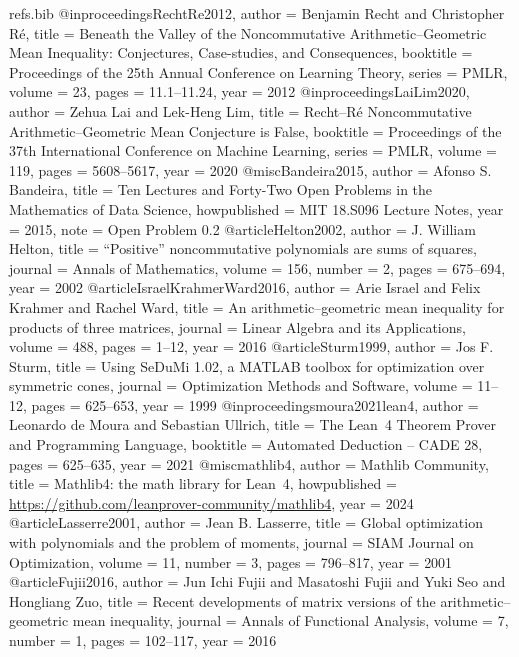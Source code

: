 %

\begin{filecontents*}{refs.bib}
@inproceedings{RechtRe2012,
  author    = {Benjamin Recht and Christopher R{\'e}},
  title     = {Beneath the Valley of the Noncommutative Arithmetic--Geometric Mean Inequality: Conjectures, Case-studies, and Consequences},
  booktitle = {Proceedings of the 25th Annual Conference on Learning Theory},
  series    = {PMLR},
  volume    = {23},
  pages     = {11.1--11.24},
  year      = {2012}
}
@inproceedings{LaiLim2020,
  author    = {Zehua Lai and Lek-Heng Lim},
  title     = {Recht--R{\'e} Noncommutative Arithmetic--Geometric Mean Conjecture is False},
  booktitle = {Proceedings of the 37th International Conference on Machine Learning},
  series    = {PMLR},
  volume    = {119},
  pages     = {5608--5617},
  year      = {2020}
}
@misc{Bandeira2015,
  author       = {Afonso S. Bandeira},
  title        = {Ten Lectures and Forty-Two Open Problems in the Mathematics of Data Science},
  howpublished = {MIT 18.S096 Lecture Notes},
  year         = {2015},
  note         = {Open Problem 0.2}
}
@article{Helton2002,
  author  = {J. William Helton},
  title   = {{``Positive''} noncommutative polynomials are sums of squares},
  journal = {Annals of Mathematics},
  volume  = {156},
  number  = {2},
  pages   = {675--694},
  year    = {2002}
}
@article{IsraelKrahmerWard2016,
  author  = {Arie Israel and Felix Krahmer and Rachel Ward},
  title   = {An arithmetic--geometric mean inequality for products of three matrices},
  journal = {Linear Algebra and its Applications},
  volume  = {488},
  pages   = {1--12},
  year    = {2016}
}
@article{Sturm1999,
  author  = {Jos F. Sturm},
  title   = {Using {SeDuMi} 1.02, a {MATLAB} toolbox for optimization over symmetric cones},
  journal = {Optimization Methods and Software},
  volume  = {11--12},
  pages   = {625--653},
  year    = {1999}
}
@inproceedings{moura2021lean4,
  author    = {Leonardo de Moura and Sebastian Ullrich},
  title     = {The {Lean}~4 Theorem Prover and Programming Language},
  booktitle = {Automated Deduction -- {CADE} 28},
  pages     = {625--635},
  year      = {2021}
}
@misc{mathlib4,
  author       = {{Mathlib Community}},
  title        = {Mathlib4: the math library for {Lean}~4},
  howpublished = {\url{https://github.com/leanprover-community/mathlib4}},
  year         = {2024}
}
@article{Lasserre2001,
  author  = {Jean B. Lasserre},
  title   = {Global optimization with polynomials and the problem of moments},
  journal = {SIAM Journal on Optimization},
  volume  = {11},
  number  = {3},
  pages   = {796--817},
  year    = {2001}
}
@article{Fujii2016,
  author  = {Jun Ichi Fujii and Masatoshi Fujii and Yuki Seo and Hongliang Zuo},
  title   = {Recent developments of matrix versions of the arithmetic--geometric mean inequality},
  journal = {Annals of Functional Analysis},
  volume  = {7},
  number  = {1},
  pages   = {102--117},
  year    = {2016}
}
\end{filecontents*}

